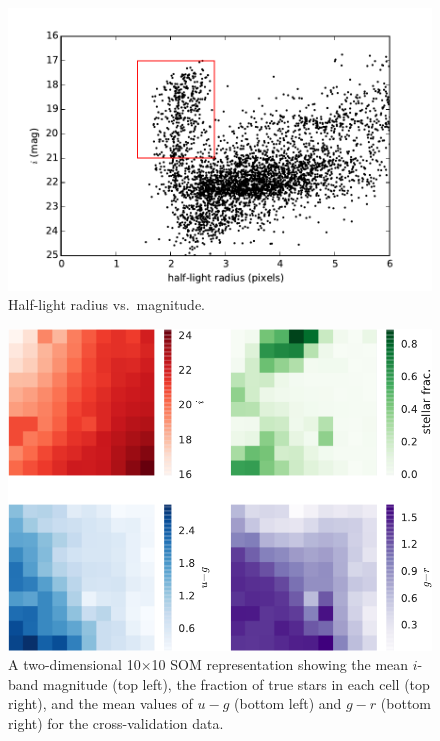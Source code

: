\vspace{100pt}

\begin{figure}[htp]
  \centering
  \includegraphics[width=0.8\linewidth]{figures/morph.pdf}
  \caption{Half-light radius vs.\ magnitude.}
  \label{fig:morph}
\end{figure}

\begin{figure}[htp]
  \centering
  \includegraphics[width=0.7\linewidth]{figures/som_colors.pdf}
  \caption{A two-dimensional 10$\times$10 SOM representation
           showing the mean $i$-band magnitude (top left),
           the fraction of true stars in each cell (top right),
           and the mean values of $u-g$ (bottom left) and $g-r$ (bottom right)
           for the cross-validation data.}
  \label{fig:som_colors}
\end{figure}

